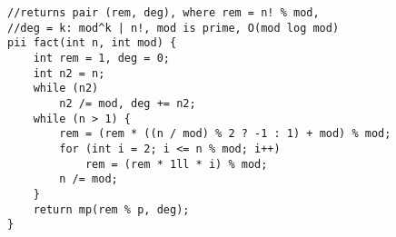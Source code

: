 \begin{verbatim}
//returns pair (rem, deg), where rem = n! % mod, 
//deg = k: mod^k | n!, mod is prime, O(mod log mod)
pii fact(int n, int mod) { 
	int rem = 1, deg = 0;
	int n2 = n;
	while (n2)
		n2 /= mod, deg += n2;
	while (n > 1) {
		rem = (rem * ((n / mod) % 2 ? -1 : 1) + mod) % mod;
		for (int i = 2; i <= n % mod; i++)
			rem = (rem * 1ll * i) % mod;
		n /= mod;
	}
	return mp(rem % p, deg);
}
\end{verbatim}
